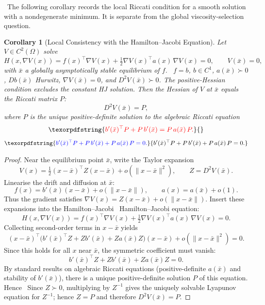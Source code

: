 \documentclass[11pt]{article}
\theoremstyle{plain}      %
\newtheorem{corollary}[theorem]{Corollary}
\theoremstyle{definition} %
\providecommand{\DIFaddtex}[1]{{\protect\color{blue}#1}} %
\providecommand{\DIFdeltex}[1]{{\protect\color{red}#1}} %
\providecommand{\DIFaddbegin}{} %
\providecommand{\DIFaddend}{} %
\providecommand{\DIFdelbegin}{} %
\providecommand{\DIFdelend}{} %
\providecommand{\DIFadd}[1]{\texorpdfstring{\DIFaddtex{#1}}{#1}} %
\providecommand{\DIFdel}[1]{\texorpdfstring{\DIFdeltex{#1}}{}} %
\newcommand{\DIFscaledelfig}{1.0}
\newlength{\DIFdelgraphicswidth} %
\newlength{\DIFdelgraphicsheight} %
\newcommand{\DIFaddincludegraphics}[2][]{{\color{blue}\fbox{\DIFOincludegraphics[#1]{#2}}}} %
\newcommand{\DIFdelincludegraphics}[2][]{%
\sbox{\DIFdelgraphicsbox}{\DIFOincludegraphics[#1]{#2}}%
\settoboxwidth{\DIFdelgraphicswidth}{\DIFdelgraphicsbox} %
\settoboxtotalheight{\DIFdelgraphicsheight}{\DIFdelgraphicsbox} %
\scalebox{\DIFscaledelfig}{%
\parbox[b]{\DIFdelgraphicswidth}{\usebox{\DIFdelgraphicsbox}\\[-\baselineskip] \rule{\DIFdelgraphicswidth}{0em}}\llap{\resizebox{\DIFdelgraphicswidth}{\DIFdelgraphicsheight}{%
\setlength{\unitlength}{\DIFdelgraphicswidth}%
\begin{picture}(1,1)%
\thicklines\linethickness{2pt} %
{\color[rgb]{1,0,0}\put(0,0){\framebox(1,1){}}}%
{\color[rgb]{1,0,0}\put(0,0){\line( 1,1){1}}}%
{\color[rgb]{1,0,0}\put(0,1){\line(1,-1){1}}}%
\end{picture}%
}\hspace*{3pt}}} %
} %
\DeclareRobustCommand{\DIFaddbegin}{\DIFOaddbegin \let\includegraphics\DIFaddincludegraphics} %
\DeclareRobustCommand{\DIFaddend}{\DIFOaddend \let\includegraphics\DIFOincludegraphics} %
\DeclareRobustCommand{\DIFdelbegin}{\DIFOdelbegin \let\includegraphics\DIFdelincludegraphics} %
\DeclareRobustCommand{\DIFdelend}{\DIFOaddend \let\includegraphics\DIFOincludegraphics} %
\begin{document}
\DIFdelbegin %
\DIFdelend\ \DIFaddbegin \DIFadd{The following corollary records the local Riccati condition for a smooth solution with a nondegenerate minimum. It is separate from the global viscosity-selection question.
}

\begin{corollary}[Local Consistency with the Hamilton--Jacobi Equation]\DIFaddend \label{cor:localHJ}
Let $V \in C^{2}(\Omega)$ solve
\[
H(x,\nabla V(x))
=f(x)^\top \nabla V(x)
+\tfrac{1}{2}\nabla V(x)^\top a(x)\,\nabla V(x)=0,
\qquad V(\bar{x})=0,
\]
with \DIFdelbegin \DIFdel{$\bar{x}$ a globally asymptotically stable equilibrium of $f$. }\DIFdelend\ \DIFaddbegin \DIFadd{$f=b$, $b\in C^1$, $a(\bar x)\succ0$, $Db(\bar x)$ Hurwitz, $\nabla V(\bar x)=0$, and $D^2V(\bar x)\succ0$. The positive-Hessian condition excludes the constant HJ solution.
}\DIFaddend Then the Hessian of $V$ at $\bar{x}$ equals the Riccati matrix $P$:
\[
D^{2}V(\bar{x})=P,
\]
where $P$ is the unique positive-definite solution to the algebraic Riccati equation
\DIFdelbegin \[
\DIFdel{b'(\bar{x})^\top P + P\,b'(\bar{x}) = P\,a(\bar{x})\,P.
}\]%
\DIFdelend \DIFaddbegin \[
\DIFadd{b'(\bar{x})^\top P + P\,b'(\bar{x}) + P\,a(\bar{x})\,P=0.
}\]\DIFaddend 
\end{corollary}

\begin{proof}
Near the equilibrium point $\bar{x}$, write the Taylor expansion
\[
V(x)=\tfrac{1}{2}(x-\bar{x})^\top Z(x-\bar{x})
+o\!\left(\|x-\bar{x}\|^{2}\right),
\qquad Z=D^{2}V(\bar{x}).
\]
Linearise the drift and diffusion at $\bar{x}$:
\[
f(x)=b'(\bar{x})(x-\bar{x})+o(\|x-\bar{x}\|),\qquad
a(x)=a(\bar{x})+o(1).
\]
Thus the gradient satisfies $\nabla V(x)=Z(x-\bar{x})+o(\|x-\bar{x}\|)$.
Insert these expansions into the \DIFdelbegin \DIFdel{Hamilton–Jacobi }\DIFdelend\ \DIFaddbegin \DIFadd{Hamilton--Jacobi }\DIFaddend equation:
\[
H(x,\nabla V(x))=
f(x)^\top\nabla V(x)
+\tfrac{1}{2}\nabla V(x)^\top a(x)\,\nabla V(x)=0.
\]
Collecting second-order terms in $x-\bar{x}$ yields
\[
(x-\bar{x})^\top\!
\bigl(b'(\bar{x})^\top Z + Z b'(\bar{x})
+Z a(\bar{x})Z\bigr)(x-\bar{x})
+o\!\left(\|x-\bar{x}\|^{2}\right)=0.
\]
Since this holds for all $x$ near $\bar{x}$, the symmetric coefficient must vanish:
\[
b'(\bar{x})^\top Z + Z b'(\bar{x}) + Z a(\bar{x})Z =0.
\]
By standard results on algebraic Riccati equations (positive-definite $a(\bar{x})$ and stability of $b'(\bar{x})$), there is a unique positive-definite solution $P$ of this equation.
\DIFdelbegin \DIFdel{Hence }\DIFdelend\ \DIFaddbegin \DIFadd{Since $Z\succ0$, multiplying by $Z^{-1}$ gives the uniquely solvable Lyapunov equation for $Z^{-1}$; hence }\DIFaddend $Z=P$ and \DIFdelbegin \DIFdel{therefore }\DIFdelend $D^{2}V(\bar{x})=P$.
\end{proof}
\end{document}
